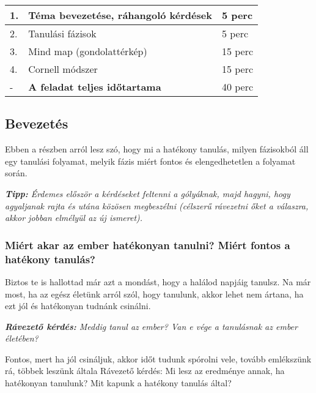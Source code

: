 \documentclass[../Main.tex]{subfiles}
\begin{document}
\begin{center}
    \begin{tabular}{| m{1.3 em} | m{} | m{} |}
    \hline
    1. & Téma bevezetése, ráhangoló kérdések & 5 perc \\
    \hline
    2. & Tanulási fázisok & 5 perc \\
    \hline
    3. & Mind map (gondolattérkép) & 15 perc \\
    \hline
    4. & Cornell módszer & 15 perc \\
    \hline
    - & \textbf{A feladat teljes időtartama} & 40 perc \\
    \hline
    \end{tabular}
\end{center}

\subsection{Bevezetés}

\begin{flushleft}
    Ebben a részben arról lesz szó, hogy mi a hatékony tanulás, milyen fázisokból áll egy tanulási folyamat,
    melyik fázis miért fontos és elengedhetetlen a folyamat során.
\end{flushleft}
\textit{\textbf{Tipp:} Érdemes először a kérdéseket feltenni a gólyáknak, majd hagyni,
hogy agyaljanak rajta és utána közösen megbeszélni (célszerű rávezetni őket a válaszra, akkor jobban elmélyül az új ismeret).}

\subsubsection{Miért akar az ember hatékonyan tanulni? \newline Miért fontos a hatékony tanulás?}

\begin{flushleft}
    Biztos te is hallottad már azt a mondást, hogy a halálod napjáig tanulsz.
    Na már most, ha az egész életünk arról szól, hogy tanulunk, akkor lehet nem ártana,
    ha ezt jól és hatékonyan tudnánk csinálni.
\end{flushleft}
\textit{\textbf{Rávezető kérdés:} Meddig tanul az ember? Van e vége a tanulásnak az ember életében?}

\begin{flushleft}
    Fontos, mert ha jól csináljuk, akkor időt tudunk spórolni vele, tovább emlékszünk rá, többek leszünk általa
    Rávezető kérdés: Mi lesz az eredménye annak, ha hatékonyan tanulunk? Mit kapunk a hatékony tanulás által?
\end{flushleft}
    
\end{document}

